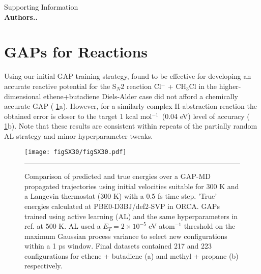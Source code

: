 \documentclass[11pt]{article}
\numberwithin{equation}{subsection}
\newcommand{\kcal}{kcal mol$^{-1}$}
\begin{document}
	
\begin{titlepage}
	\vspace*{\fill}
	\begin{center}
		{\huge Supporting Information}\\
		\vspace{0.2cm}
		{\large\bfseries{Authors..}}
	\end{center}
	\vspace*{\fill}

\end{titlepage}	
\newpage

\tableofcontents
\clearpage


\section{GAPs for Reactions}

Using our initial GAP training strategy,\cite{gaptrain2021} found to be effective for developing an accurate reactive potential for the S${}_N$2 reaction Cl${}^{-}$ + CH${}_3$Cl in the higher-dimensional ethene+butadiene Diels-Alder case did not afford a chemically accurate GAP (\figurename{ \ref{fig::SX30}a}). However, for a similarly complex H-abstraction reaction the obtained error is closer to the target 1 \kcal~(0.04 eV) level of accuracy (\figurename{ \ref{fig::SX30}b}). Note that these results are consistent within repeats of the partially random AL strategy and minor hyperparameter tweaks.


\begin{figure}[h!]
\centering
\vspace{0.4cm}
\texttt{[image: figSX30/figSX30.pdf]}
\vspace{0.0cm}
\hrule
\vspace{0.1cm}
\caption{Comparison of predicted and true energies over a GAP-MD propagated trajectories using initial velocities suitable for 300 K and a Langevin thermostat (300 K) with a 0.5 fs time step. 'True' energies calculated at PBE0-D3BJ/def2-SVP in ORCA. GAPs trained using active learning (AL) and the same hyperparameters in ref. \cite{gaptrain2021} at 500 K. AL used a $E_T = 2\times10^{-5}$ eV atom${}^{-1}$ threshold on the maximum Gaussian process variance to select new configurations within a 1 ps window. Final datasets contained 217 and 223 configurations for ethene + butadiene (a) and methyl + propane (b) respectively.}
\label{fig::SX30}
\end{figure}
\end{document}
